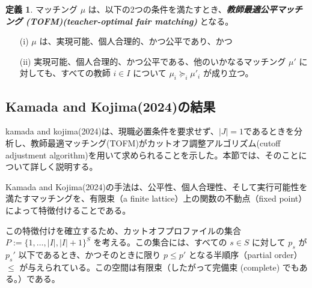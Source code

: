 \documentclass[12pt, a4paper]{article}
\theoremstyle{definition}
\newtheorem{defn}{定義}
\theoremstyle{remark}
\theoremstyle{plain}
\begin{document}
  



\begin{defn}
マッチング $\mu$ は、以下の2つの条件を満たすとき、\textbf{\textit{教師最適公平マッチング (TOFM)(teacher-optimal fair matching) }} となる。
\begin{itemize}
    \item[(i)] $\mu$ は、実現可能、個人合理的、かつ公平であり、かつ
    \item[(ii)] 実現可能、個人合理的、かつ公平である、他のいかなるマッチング $\mu'$ に対しても、すべての教師 $i \in I$ について $\mu_i \succeq_i \mu'_i$ が成り立つ。
\end{itemize}
\end{defn}





\subsection{Kamada and Kojima(2024)の結果}
kamada and kojima(2024)は、現職必置条件を要求せず、$|J| = 1$であるときを分析し、教師最適マッチング(TOFM)がカットオフ調整アルゴリズム(cutoff adjustment algorithm)を用いて求められることを示した。本節では、そのことについて詳しく説明する。




Kamada and Kojima(2024)の手法は、公平性、個人合理性、そして実行可能性を満たすマッチングを、有限束（a finite lattice）上の関数の不動点（fixed point）によって特徴付けることである。

この特徴付けを確立するため、カットオフプロファイルの集合 \( P := \{ 1, \ldots, | I |, | I | + 1 \} ^S \) を考える。この集合には、すべての \( s \in S \) に対して \( p_s \) が \( p_s' \) 以下であるとき、かつそのときに限り \( p \leq p' \) となる半順序（partial order）\( \leq \) が与えられている。この空間は有限束（したがって完備束 (complete) でもある。）である。
\end{document}
